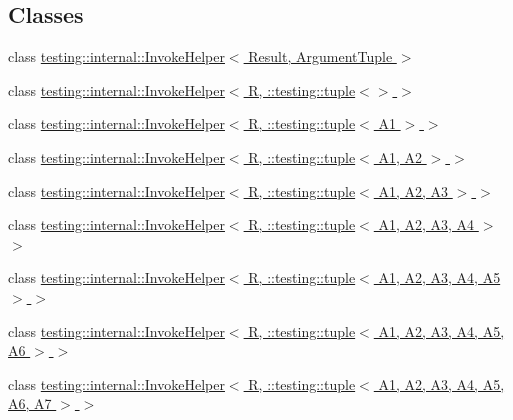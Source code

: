\subsection*{Classes}
\begin{DoxyCompactItemize}
\item 
class \hyperlink{classtesting_1_1internal_1_1_invoke_helper}{testing\+::internal\+::\+Invoke\+Helper$<$ Result, Argument\+Tuple $>$}
\item 
class \hyperlink{classtesting_1_1internal_1_1_invoke_helper_3_01_r_00_01_1_1testing_1_1tuple_3_4_01_4}{testing\+::internal\+::\+Invoke\+Helper$<$ R, \+::testing\+::tuple$<$$>$ $>$}
\item 
class \hyperlink{classtesting_1_1internal_1_1_invoke_helper_3_01_r_00_01_1_1testing_1_1tuple_3_01_a1_01_4_01_4}{testing\+::internal\+::\+Invoke\+Helper$<$ R, \+::testing\+::tuple$<$ A1 $>$ $>$}
\item 
class \hyperlink{classtesting_1_1internal_1_1_invoke_helper_3_01_r_00_01_1_1testing_1_1tuple_3_01_a1_00_01_a2_01_4_01_4}{testing\+::internal\+::\+Invoke\+Helper$<$ R, \+::testing\+::tuple$<$ A1, A2 $>$ $>$}
\item 
class \hyperlink{classtesting_1_1internal_1_1_invoke_helper_3_01_r_00_01_1_1testing_1_1tuple_3_01_a1_00_01_a2_00_01_a3_01_4_01_4}{testing\+::internal\+::\+Invoke\+Helper$<$ R, \+::testing\+::tuple$<$ A1, A2, A3 $>$ $>$}
\item 
class \hyperlink{classtesting_1_1internal_1_1_invoke_helper_3_01_r_00_01_1_1testing_1_1tuple_3_01_a1_00_01_a2_00_01_a3_00_01_a4_01_4_01_4}{testing\+::internal\+::\+Invoke\+Helper$<$ R, \+::testing\+::tuple$<$ A1, A2, A3, A4 $>$ $>$}
\item 
class \hyperlink{classtesting_1_1internal_1_1_invoke_helper_3_01_r_00_01_1_1testing_1_1tuple_3_01_a1_00_01_a2_00_5dd6c0827e45a39a81d93a14211e2a19}{testing\+::internal\+::\+Invoke\+Helper$<$ R, \+::testing\+::tuple$<$ A1, A2, A3, A4, A5 $>$ $>$}
\item 
class \hyperlink{classtesting_1_1internal_1_1_invoke_helper_3_01_r_00_01_1_1testing_1_1tuple_3_01_a1_00_01_a2_00_5653fefa261cff106ebaaf9c78f6ee42}{testing\+::internal\+::\+Invoke\+Helper$<$ R, \+::testing\+::tuple$<$ A1, A2, A3, A4, A5, A6 $>$ $>$}
\item 
class \hyperlink{classtesting_1_1internal_1_1_invoke_helper_3_01_r_00_01_1_1testing_1_1tuple_3_01_a1_00_01_a2_00_9169216bddd5005837acd145af38ec6f}{testing\+::internal\+::\+Invoke\+Helper$<$ R, \+::testing\+::tuple$<$ A1, A2, A3, A4, A5, A6, A7 $>$ $>$}
\item 

\end{DoxyCompactItemize}

